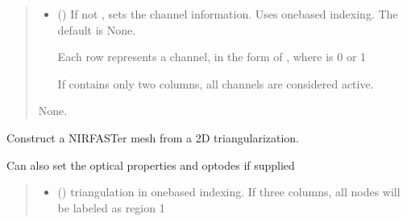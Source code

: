 \documentclass[letterpaper,10pt,english]{sphinxmanual}
\begin{document}
\begin{fulllineitems}
\begin{fulllineitems}
\begin{quote}
\begin{description}
\begin{itemize}
\item {} 
\sphinxAtStartPar
{} (\sphinxstyleliteralemphasis{\sphinxupquote{, }}) \textendash{} 
\sphinxAtStartPar
If not , sets the channel information. Uses one\sphinxhyphen{}based indexing. The default is None.

\sphinxAtStartPar
Each row represents a channel, in the form of , where  is 0 or 1

\sphinxAtStartPar
If  contains only two columns, all channels are considered active.


\end{itemize}

\sphinxAtStartPar
None.

\end{description}\end{quote}

\end{fulllineitems}


\begin{fulllineitems}
\label{\detokenize{_autosummary/nirfasterff.base.dcs_mesh.dcsmesh:nirfasterff.base.dcs_mesh.dcsmesh.from_triangle}}
\pysigstartsignatures
{}
\pysigstopsignatures
\sphinxAtStartPar
Construct a NIRFASTer mesh from a 2D triangularization.

\sphinxAtStartPar
Can also set the optical properties and optodes if supplied
\begin{quote}\begin{description}
\begin{itemize}
\item {} 
\sphinxAtStartPar
{} () \textendash{} 
\sphinxAtStartPar
triangulation in one\sphinxhyphen{}based indexing. If three columns, all nodes will be labeled as region 1


\end{itemize}
\end{description}
\end{quote}
\end{fulllineitems}
\end{fulllineitems}
\end{document}
